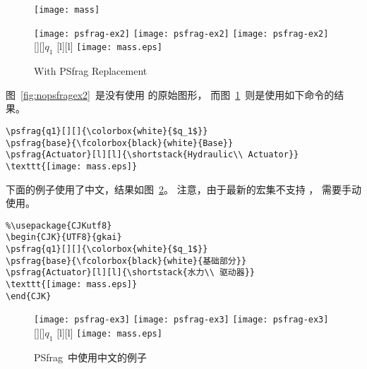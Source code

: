 \begin{figure}
\begin{minipage}[b]{.5\textwidth}
\centering
\texttt{[image: mass]}
\caption{Without PSfrag Replacement}\label{fig:nopsfragex2}
\par\vspace{0pt}
\end{minipage}%
\begin{minipage}[b]{.5\textwidth}
\centering
\ifxetex
\texttt{[image: psfrag-ex2]}
\else
\ifpdf
\texttt{[image: psfrag-ex2]}
\else
\ifdvipdfm
\texttt{[image: psfrag-ex2]}
\else
{}[][]{\colorbox{white}{$q_1$}}
[l][l]{}
\texttt{[image: mass.eps]}
\fi
\fi
\fi
\caption{With PSfrag Replacement}\label{fig:psfragex2}
\par\vspace{0pt}
\end{minipage}
\end{figure}

图~\ref{fig:nopsfragex2}~是没有使用  的原始图形，
而图~\ref{fig:psfragex2}~则是使用如下命令的结果。
\begin{lstlisting}
\psfrag{q1}[][]{\colorbox{white}{$q_1$}}
\psfrag{base}{\fcolorbox{black}{white}{Base}}
\psfrag{Actuator}[l][l]{\shortstack{Hydraulic\\ Actuator}}
\texttt{[image: mass.eps]}
\end{lstlisting}

下面的例子使用了中文，结果如图~\ref{fig:psfragex3}。
注意，由于最新的宏集不支持 ，
需要手动使用。
\begin{lstlisting}
%\usepackage{CJKutf8}
\begin{CJK}{UTF8}{gkai}
\psfrag{q1}[][]{\colorbox{white}{$q_1$}}
\psfrag{base}{\fcolorbox{black}{white}{基础部分}}
\psfrag{Actuator}[l][l]{\shortstack{水力\\ 驱动器}}
\texttt{[image: mass.eps]}
\end{CJK}
\end{lstlisting}

\begin{figure}
\centering
\ifxetex
\texttt{[image: psfrag-ex3]}
\else
\ifpdf
\texttt{[image: psfrag-ex3]}
\else
\ifdvipdfm
\texttt{[image: psfrag-ex3]}
\else
{}[][]{\colorbox{white}{$q_1$}}
[l][l]{}
\texttt{[image: mass.eps]}
\fi
\fi
\fi
\caption{PSfrag~{中使用中文的例子}}\label{fig:psfragex3}
\end{figure}

